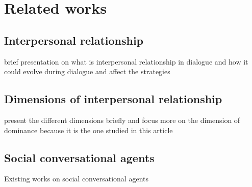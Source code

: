 \documentclass{llncs}
\begin{document}
\section{Related works}
\subsection{Interpersonal relationship}
brief presentation on what is interpersonal relationship in dialogue and how it could evolve during dialogue and affect the strategies
\subsection{Dimensions of interpersonal relationship}
present the different dimensions briefly and focus more on the dimension of dominance because it is the one studied in this article
\subsection{Social conversational agents}
 Existing works on social conversational agents
\noindent 
\vskip 4pt


\end{document}
